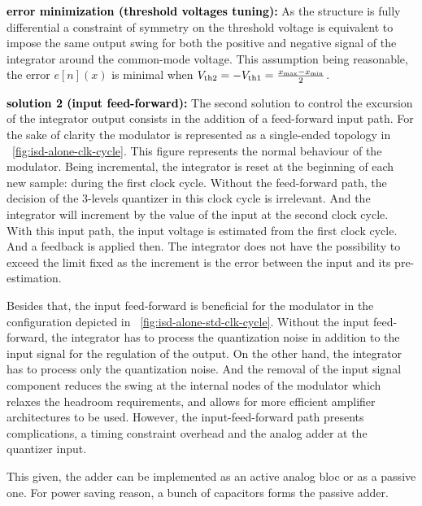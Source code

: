 \textbf{\textcolor{black}{error minimization (threshold voltages tuning):}}
As the structure is fully differential a constraint of symmetry on the threshold voltage is equivalent to impose the same output swing for both the positive and negative signal of the integrator around the common-mode voltage. This assumption being reasonable, the error \(e[n](x) \) is minimal when \(V_{\rm th2}=-V_{\rm th1}=\frac{x_{\max}-x_{\min}}{2} \).

\textbf{\textcolor{black}{solution 2 (input feed-forward):}}
The second solution to control the excursion of the integrator output consists in the addition of a feed-forward input path. For the sake of clarity the modulator is represented as a single-ended topology in \figurename~\ref{fig:isd-alone-clk-cycle}. This figure represents the normal behaviour of the modulator. Being incremental, the integrator is reset at the beginning of each new sample: during the first clock cycle. Without the feed-forward path, the decision of the 3-levels quantizer in this clock cycle is irrelevant. And the integrator will increment by the value of the input at the second clock cycle. With this input path, the input voltage is estimated from the first clock cycle. And a feedback is applied then. The integrator does not have the possibility to exceed the limit fixed as the increment is the error between the input and its pre-estimation.

Besides that, the input feed-forward is beneficial for the modulator in the configuration depicted in \figurename~\ref{fig:isd-alone-std-clk-cycle}. Without the input feed-forward, the integrator has to process the quantization noise in addition to the input signal for the regulation of the output. On the other hand, the integrator has to process only the quantization noise. And the removal of the input signal component reduces the swing at the internal nodes of the modulator which relaxes the headroom requirements, and allows for more efficient amplifier architectures to be used. However, the input-feed-forward path presents complications, a timing constraint overhead and the analog adder at the quantizer input.

This given, the adder can be implemented as an active analog bloc or as a passive one. For power saving reason, a bunch of capacitors forms the passive adder.

